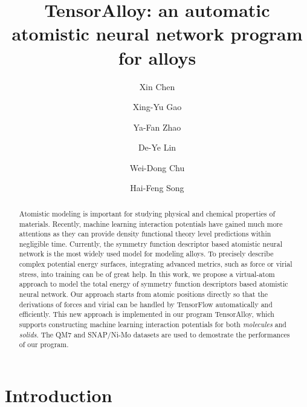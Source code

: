 \documentclass[preprint]{revtex4-2}
\begin{document}
\title{
    TensorAlloy: an automatic atomistic neural network program for alloys
}
\author{Xin Chen}
\author{Xing-Yu Gao}
\author{Ya-Fan Zhao}
\author{De-Ye Lin}
\author{Wei-Dong Chu}
\author{Hai-Feng Song}


\begin{abstract}
Atomistic modeling is important for studying physical and chemical properties of
materials. Recently, machine learning interaction potentials have gained much 
more attentions as they can provide density functional theory level predictions 
within negligible time. Currently, the symmetry function descriptor based 
atomistic neural network is the most widely used model for modeling alloys. 
To precisely describe complex potential energy surfaces, integrating advanced 
metrics, such as force or virial stress, into training can be of great help.  
In this work, we propose a virtual-atom approach to model the total energy of 
symmetry function descriptors based atomistic neural network. Our approach 
starts from atomic positions directly so that the derivations of forces and 
virial can be handled by TensorFlow automatically and efficiently. This new 
approach is implemented in our program TensorAlloy, which supports constructing 
machine learning interaction potentials for both \textit{molecules} and 
\textit{solids}. The QM7 and SNAP/Ni-Mo datasets are used to demostrate the 
performances of our program.
\end{abstract}

\maketitle

% 
%
\newpage

\section{Introduction}
\end{document}
